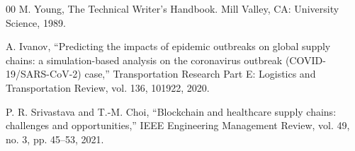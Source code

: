 \documentclass[conference]{IEEEtran}
\begin{document}
\begin{thebibliography}{00}
M. Young,
The Technical Writer's Handbook.
Mill Valley, CA: University Science, 1989.

A. Ivanov,
``Predicting the impacts of epidemic outbreaks on global supply chains: a simulation-based analysis on the coronavirus outbreak (COVID-19/SARS-CoV-2) case,''
Transportation Research Part E: Logistics and Transportation Review, vol. 136, 101922, 2020.

P. R. Srivastava and T.-M. Choi,
``Blockchain and healthcare supply chains: challenges and opportunities,''
IEEE Engineering Management Review, vol. 49, no. 3, pp. 45--53, 2021.

\end{thebibliography}
\end{document}
